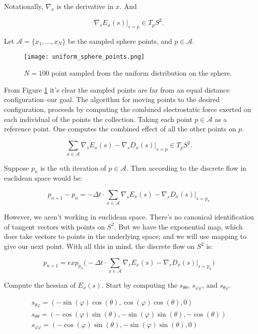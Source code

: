 \documentclass[10pt]{article}
\begin{document}
Notationally, $\nabla_x$ is the derivative in $x$. And

\[
	\nabla_s E_x(s) |_{s=p} \in T_{p}S^2.
\]

Let $\mathcal{A} = \{ x_1, \ldots, x_N \}$ be the sampled sphere points, and $p \in \mathcal{A}$.

\begin{figure}
	\centering
	\texttt{[image: uniform\_sphere\_points.png]}
	\caption{$N=100$ point sampled from the uniform distribution on the sphere.}
	\label{fig:sampledpoints}
\end{figure}

From Figure \ref{fig:sampledpoints} it's clear the sampled points are far from an equal distance configuration--our goal. The algorithm for moving points to the desired configuration, proceeds by computing the combined electrostatic force exerted on each individual of the points the collection. Taking each point $p \in \mathcal{A}$ as a reference point. One computes the combined effect of all the other points on $p$.

\[
	\sum_{x \in \mathcal{A}} \nabla_s E_x(s)  - \nabla_{s} D_{x}(s) |_{s=p}  \in T_{p}S^2.
\]

Suppose $p_n$ is the $n$th iteration of $p \in \mathcal{A}$. Then according to the discrete flow in euclidean space would be:

\begin{equation}
p_{n+1} - p_{n} = - \Delta t \cdot \sum_{x \in \mathcal{A}} \nabla_s E_x(s) - \nabla_{s} D_{x}(s) |_{s=p_n} 
\end{equation}

However, we aren't working in euclidean space. There's no canonical identification of tangent vectors with points on $S^2$. But we have the exponential map, which does take vectors to points in the underlying space; and we will use mapping to give our next point. With all this in mind, the discrete flow on $S^2$ is:

\[
	p_{n+1} = exp_{p_{n}}\Big( - \Delta t \cdot \sum_{x \in \mathcal{A}} \nabla_s E_x(s) - \nabla_{s} D_{x}(s) |_{s=p_n} \Big)
\]


Compute the hessian of $E_x(s)$. Start by computing the $s_{\theta \theta}$, $s_{\varphi\varphi}$, and $s_{\theta \varphi}$.

\begin{gather*}
s_{\theta \varphi} = ( -\sin(\varphi) \cos(\theta), \cos(\varphi)\cos(\theta), 0 ) \\
s_{\theta \theta} = (-\cos(\varphi) \sin(\theta), -\sin(\varphi)\sin(\theta), -\cos(\theta)) \\
s_{\varphi \varphi} = (-\cos(\varphi) \sin(\theta), -\sin(\varphi)\sin(\theta), 0)
\end{gather*}
\end{document}
